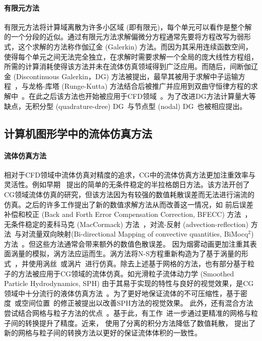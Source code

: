 \paragraph{有限元方法}
有限元方法将计算域离散为许多小区域 (即有限元)，每个单元可以看作是整个解的一个分段的近似。通过有限元方法求解偏微分方程通常先要将方程改写为弱形式，这个求解的方法称作伽辽金 (Galerkin) 方法。而因为其采用连续函数空间，使得每个单元之间无法完全独立，在求解时需要求解一个全局的庞大线性方程组，所需的计算消耗使得该方法并未在流体仿真领域得到广泛应用。而随后，间断伽辽金 (Discontinuous Galerkin，DG) 方法被提出，最早其被用于求解中子运输方程~\citep{reed1973triangular}，与龙格-库塔 (Runge-Kutta) 方法结合后被推广并应用到双曲守恒律方程的求解中~\citep{cockburn2001runge, cockburn1990runge, cockburn1989tvb2, cockburn1989tvb3}。在此之后该方法也开始被应用于CFD领域~\citep{Zienkiewicz-2013, lomtev1999discontinuous, bassi1997high}。为了改进DG方法计算量大等缺点，无积分型 (quadrature-dree) DG~\citep{atkins1998quadrature}与节点型 (nodal) DG~\citep{hesthaven2007nodal}也被相应提出。

\subsection{计算机图形学中的流体仿真方法}
\label{sec:1_related_works_CG}
\paragraph{流体仿真方法}
相对于CFD领域中流体仿真对精度的追求，CG中的流体仿真方法更加注重效率与灵活性。例如早期~\citet{Stam-1999} 提出的简单的无条件稳定的半拉格朗日方法。该方法开创了CG领域流体仿真的研究，但该方法因为有较强的数值耗散误差而无法进行湍流的仿真。之后的许多工作提出了新的数值求解方法从而改善这一情况，如 前后误差补偿和校正 (Back and Forth Error Compensation Correction, BFECC) 方法~\citep{Kim-2005}，无条件稳定的麦科马克 (MacCormack) 方法~\citep{Selle-2008}，对流-反射 (advection-reflection) 方法~\citep{Zehnder-2018}与对流量双向映射(Bi-directional Mapping of convective quantities, BiMocq$^2$) 方法~\citep{Qu-2019}。但这些方法通常会带来额外的数值色散误差。
因为烟雾动画更加注重其表面涡量的模拟，涡方法应运而生。涡方法将N-S方程重新构造为了基于涡量的形式~\citep{Park-2005, Selle-2005}，并使用涡丝~\citep{Weissmann-2010, Angelidis-2005}或涡片~\citep{Zhang-2015, Zhang-2014, Pfaff-2012}进行仿真。除去上述基于网格的方法，也有部分基于粒子的方法被应用于CG领域的流体仿真。如光滑粒子流体动力学 (Smoothed Particle Hydrodynamics, SPH) 由于其易于实现的特性与良好的视觉效果，是CG领域中十分流行的液体仿真方法~\citep{Ihmsen-2014-1, Becker-2007, Adams-2007, Muller-2003, Desbrun-1996}。为了更好地保证流体的不可压缩性，基于密度~\citep{Bender-2015, Ihmsen-2014-2, Solenthaler-2009}或空间位置~\citep{Macklin-2013}的修正被提出以改善SPH方法的视觉效果。
此外，还有混合方法尝试结合网格与粒子方法的优点~\citep{Zhu-2005, Foster-1996, Brackbill-1986, Harlow-1962}。基于此，有工作~\citep{Fu-2017, Jiang-2015}进一步通过更精准的网格与粒子间的转换提升了精度。近来，\citet{Fei-2021} 使用了分离的积分方法降低了数值耗散，\citet{Qu-2022} 提出了新的网格与粒子间的转换方法以更好的保证流体体积的一致性。

